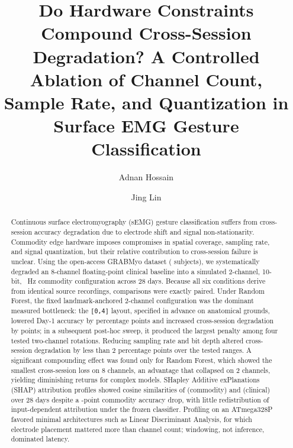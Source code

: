 \documentclass[preprint,12pt]{elsarticle}
\begin{document}
\begin{frontmatter}

\title{Do Hardware Constraints Compound Cross-Session Degradation? A Controlled Ablation of Channel Count, Sample Rate, and Quantization in Surface EMG Gesture Classification}

\author[a,b]{Adnan Hossain}
\author[b]{Jing Lin}




\thispagestyle{fancy} %
\begin{abstract}
Continuous surface electromyography (sEMG) gesture classification suffers from cross-session accuracy degradation due to electrode shift and signal non-stationarity. Commodity edge hardware imposes compromises in spatial coverage, sampling rate, and signal quantization, but their relative contribution to cross-session failure is unclear. Using the open-access GRABMyo dataset (\nSubjects{} subjects), we systematically degraded an 8-channel floating-point clinical baseline into a simulated 2-channel, 10-bit, \fsCommodity{}~Hz commodity configuration across 28 days. Because all six conditions derive from identical source recordings, comparisons were exactly paired. Under Random Forest, the fixed landmark-anchored 2-channel configuration was the dominant measured bottleneck: the \texttt{[0,4]} layout, specified in advance on anatomical grounds, lowered Day-1 accuracy by \spatialDayOnePenalty{} percentage points and increased cross-session degradation by \spatialDropPenalty{} points; in a subsequent post-hoc sweep, it produced the largest penalty among four tested two-channel rotations. Reducing sampling rate and bit depth altered cross-session degradation by less than 2 percentage points over the tested ranges. A significant compounding effect was found only for Random Forest, which showed the smallest cross-session loss on 8 channels, an advantage that collapsed on 2 channels, yielding diminishing returns for complex models. SHapley Additive exPlanations (SHAP) attribution profiles showed cosine similarities of \shapCosineCommodity{} (commodity) and \shapCosineClinical{} (clinical) over 28 days despite a \rfCommDrop{}-point commodity accuracy drop, with little redistribution of input-dependent attribution under the frozen classifier. Profiling on an ATmega328P favored minimal architectures such as Linear Discriminant Analysis, for which electrode placement mattered more than channel count; windowing, not inference, dominated latency.
\end{abstract}


\end{frontmatter}
\end{document}
